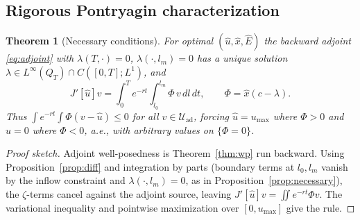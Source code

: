 \documentclass[pdflatex,sn-mathphys-num]{sn-jnl}
\newcommand{\Uad}{\mathcal{U}_{\mathrm{ad}}}
\newcommand{\Qt}{Q_T}
\theoremstyle{thmstyleone}
\newtheorem{theorem}{Theorem}[section]
\theoremstyle{definition}
\theoremstyle{remark}
\begin{document}
\subsection{Rigorous Pontryagin characterization}
\begin{theorem}[Necessary conditions]\label{thm:pmp}
For optimal $(\hat u,\hat x,\hat E)$ the backward adjoint \eqref{eq:adjoint} with
$\lambda(T,\cdot)=0$, $\lambda(\cdot,l_m)=0$ has a unique solution
$\lambda\in L^\infty(\Qt)\cap C([0,T];L^1)$, and
\[
J'[\hat u]v=\int_0^T e^{-rt}\!\int_{l_0}^{l_m}\Phi\,v\,dl\,dt,\qquad \Phi=\hat x(c-\lambda).
\]
Thus $\int e^{-rt}\!\int\Phi(v-\hat u)\le0$ for all $v\in\Uad$, forcing
$\hat u=u_{\max}$ where $\Phi>0$ and $\hat u=0$ where $\Phi<0$, a.e., with arbitrary
values on $\{\Phi=0\}$.
\end{theorem}
\begin{proof}[Proof sketch]
Adjoint well-posedness is Theorem~\ref{thm:wp} run backward. Using
Proposition~\ref{prop:diff} and integration by parts (boundary terms at $l_0,l_m$
vanish by the inflow constraint and $\lambda(\cdot,l_m)=0$, as in
Proposition~\ref{prop:necessary}), the $\zeta$-terms cancel against the adjoint
source, leaving $J'[\hat u]v=\iint e^{-rt}\Phi v$. The variational inequality and
pointwise maximization over $[0,u_{\max}]$ give the rule.
\end{proof}


\end{document}
